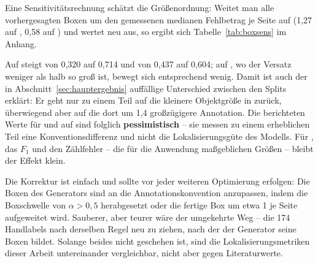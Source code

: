  Eine Sensitivitätsrechnung schätzt die
Größenordnung: Weitet man alle vorhergesagten Boxen um den gemessenen medianen
Fehlbetrag je Seite auf (1,27\px{} auf , 0,58\px{} auf ) und
wertet neu aus, so ergibt sich Tabelle~\ref{tab:boxsens} im Anhang.

Auf  steigt \mAPseven{} von 0,320 auf 0,714 und \mAPall{} von 0,437
auf 0,604; auf , wo der Versatz weniger als halb so groß ist, bewegt
sich entsprechend wenig. Damit ist auch der in
Abschnitt~\ref{sec:hauptergebnis} auffällige Unterschied zwischen den Splits
erklärt: Er geht nur zu einem Teil auf die kleinere Objektgröße in 
zurück, überwiegend aber auf die dort um 1,4\px{} großzügigere Annotation. Die
berichteten Werte für \mAPseven{} und \mAPall{} auf  sind folglich
\textbf{pessimistisch} -- sie messen zu einem erheblichen Teil eine
Konventionsdifferenz und nicht die Lokalisierungsgüte des Modells. Für
\mAPfifty{}, das $F_1$ und den Zählfehler -- die für die Anwendung maßgeblichen
Größen -- bleibt der Effekt klein.

 Die Korrektur ist einfach und sollte vor jeder weiteren
Optimierung erfolgen: Die Boxen des Generators sind an die Annotationskonvention
anzupassen, indem die Boxschwelle von $\alpha > 0{,}5$ herabgesetzt oder die
fertige Box um etwa 1\px{} je Seite aufgeweitet wird. Sauberer, aber teurer wäre
der umgekehrte Weg -- die 174 Handlabels nach derselben Regel neu zu ziehen, nach
der der Generator seine Boxen bildet. Solange beides nicht geschehen ist, sind
die Lokalisierungsmetriken dieser Arbeit untereinander vergleichbar, nicht aber
gegen Literaturwerte.

